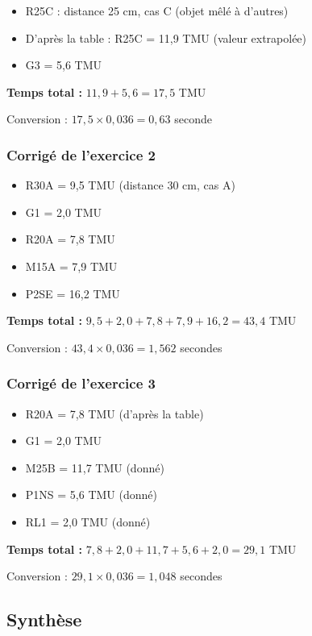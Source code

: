 \documentclass[a4paper,12pt]{article}
\begin{document}
\begin{itemize}
    \item R25C : distance 25 cm, cas C (objet mêlé à d'autres)
    \item D'après la table : R25C = 11,9 TMU (valeur extrapolée)
    \item G3 = 5,6 TMU
\end{itemize}

\textbf{Temps total :} $11,9 + 5,6 = 17,5$ TMU

Conversion : $17,5 \times 0,036 = 0,63$ seconde

\subsubsection{Corrigé de l'exercice 2}

\begin{itemize}
    \item R30A = 9,5 TMU (distance 30 cm, cas A)
    \item G1 = 2,0 TMU
    \item R20A = 7,8 TMU
    \item M15A = 7,9 TMU
    \item P2SE = 16,2 TMU
\end{itemize}

\textbf{Temps total :} $9,5 + 2,0 + 7,8 + 7,9 + 16,2 = 43,4$ TMU

Conversion : $43,4 \times 0,036 = 1,562$ secondes

\subsubsection{Corrigé de l'exercice 3}

\begin{itemize}
    \item R20A = 7,8 TMU (d'après la table)
    \item G1 = 2,0 TMU
    \item M25B = 11,7 TMU (donné)
    \item P1NS = 5,6 TMU (donné)
    \item RL1 = 2,0 TMU (donné)
\end{itemize}

\textbf{Temps total :} $7,8 + 2,0 + 11,7 + 5,6 + 2,0 = 29,1$ TMU

Conversion : $29,1 \times 0,036 = 1,048$ secondes

\subsection{Synthèse}
\end{document}

